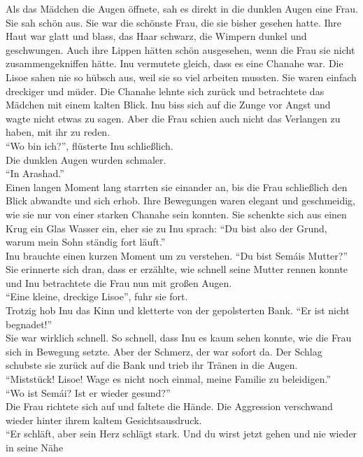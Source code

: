 Als das Mädchen die Augen öffnete, sah es direkt in die dunklen Augen eine Frau. Sie sah schön aus. 
Sie war die schönste Frau, die sie bisher gesehen hatte. Ihre Haut war glatt und blass, das Haar 
schwarz, die Wimpern dunkel und geschwungen. Auch ihre Lippen hätten schön ausgesehen, wenn die 
Frau sie nicht zusammengekniffen hätte. Inu vermutete gleich, dass es eine Chanahe war. Die Lisoe 
sahen nie so hübsch aus, weil sie so viel arbeiten mussten. Sie waren einfach dreckiger und müder. 
Die Chanahe lehnte sich zurück und betrachtete das Mädchen mit einem kalten Blick. Inu biss sich 
auf die Zunge vor Angst und wagte nicht etwas zu sagen. Aber die Frau schien auch nicht das 
Verlangen zu haben, mit ihr zu reden. \\
``Wo bin ich?'', flüsterte Inu schließlich.\\
Die dunklen Augen wurden schmaler.\\
``In Arashad.''\\
Einen langen Moment lang starrten sie einander an, bis die Frau schließlich den Blick abwandte und 
sich erhob. Ihre Bewegungen waren elegant und geschmeidig, wie sie nur von einer starken Chanahe 
sein konnten. Sie schenkte sich aus einen Krug ein Glas Wasser ein, eher sie zu Inu sprach: ``Du 
bist also der Grund, warum mein Sohn ständig fort läuft.''\\
Inu brauchte einen kurzen Moment um zu verstehen. ``Du bist Semáis Mutter?''\\
Sie erinnerte sich dran, dass er erzählte, wie schnell seine Mutter rennen konnte und Inu 
betrachtete die Frau nun mit großen Augen. \\
``Eine kleine, dreckige Lisoe'', fuhr sie fort.\\
Trotzig hob Inu das Kinn und kletterte von der gepolsterten Bank. ``Er ist nicht begnadet!''\\
Sie war wirklich schnell. So schnell, dass Inu es kaum sehen konnte, wie die Frau sich in Bewegung 
setzte. Aber der Schmerz, der war sofort da. Der Schlag schubste sie zurück auf die Bank und 
trieb ihr Tränen in die Augen. \\
``Miststück! Lisoe! Wage es nicht noch einmal, meine Familie zu beleidigen.''\\
``Wo ist Semái? Ist er wieder gesund?''\\
Die Frau richtete sich auf und faltete die Hände. Die Aggression verschwand wieder hinter ihrem 
kaltem Gesichtsausdruck. \\
``Er schläft, aber sein Herz schlägt stark. Und du wirst jetzt gehen und nie wieder in seine Nähe 
